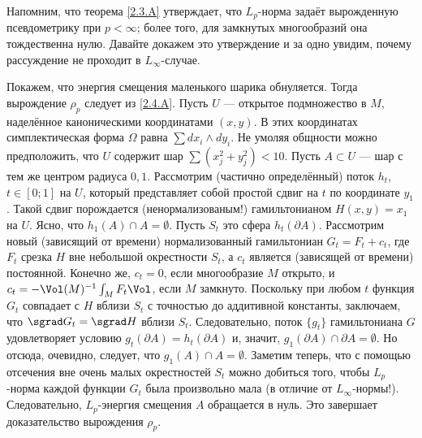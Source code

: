

Напомним, что теорема \ref{2.3.A} утверждает, что $L_p$-норма задаёт вырожденную псевдометрику при $p <\infty$;
более того, для замкнутых многообразий она тождественна нулю.
Давайте докажем это утверждение и за одно увидим, почему рассуждение не проходит в $L_\infty$-случае.

 Покажем, что энергия смещения маленького шарика обнуляется.
Тогда вырождение $\rho_p$ следует из \ref{2.4.A}.
Пусть $U$ --- открытое подмножество в $M$, наделённое каноническими координатами $(x, y)$.
В этих координатах симплектическая форма $\Omega$ равна $\sum dx_i\wedge dy_i$.
Не умоляя общности можно предположить, что $U$ содержит шар $\sum(x^2_j + y_j^2) <10$.
Пусть $A \subset U$ --- шар с тем же центром радиуса $0{,}1$.
Рассмотрим (частично определённый) поток $h_t$, $t \in [0; 1]$ на $U$, который представляет собой простой сдвиг на $t$ по координате $y_1$.
Такой сдвиг порождается (ненормализованым!) гамильтонианом $H (x, y) = x_1$ на $U$.
Ясно, что $h_1 (A) \cap A = \emptyset$.
Пусть $S_t$ это сфера $h_t (\partial A)$.
Рассмотрим новый (зависящий от времени) нормализованный гамильтониан
$G_t = F_t + c_t$, где $F_t$ срезка $H$ вне небольшой окрестности $S_t$, а $c_t$ является (зависящей от времени) постоянной.
Конечно же, $c_t = 0$, если многообразие $M$ открыто, и $c_t = -\Vol(M)^{-1}\int_M F_t \Vol$, если $M$ замкнуто.
Поскольку при любом $t$ функция $G_t$ совпадает с $H$ вблизи $S_t$ с точностью до аддитивной константы, заключаем, что $\sgrad G_t = \sgrad H$ вблизи $S_t$.
Следовательно, поток $\{g_t\}$ гамильтониана $G$ удовлетворяет условию $g_t (\partial A) = h_t (\partial A)$ и, значит, $g_1 (\partial A) \cap \partial A = \emptyset$.
Но отсюда, очевидно, следует, что $g_1 (A) \cap A = \emptyset$.
Заметим теперь, что с помощью отсечения вне очень малых окрестностей $S_t$ можно добиться того, чтобы $L_p$-норма каждой функции $G_t$ была произвольно мала (в отличие от $L_\infty$-нормы!).
Следовательно, $L_p$-энергия смещения $A$ обращается в нуль.
Это завершает доказательство вырождения $\rho_p$.

